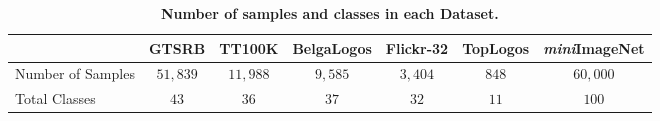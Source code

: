 \begin{table*}[h!]
\centering
\caption{\textbf{Number of samples and classes in each Dataset.}}
\begin{tabular}{@{}lcccccc@{}}
\toprule
                  & GTSRB    & TT100K   & BelgaLogos & Flickr-32 & TopLogos & \textit{mini}ImageNet \\ \midrule
Number of Samples & $51,839$ & $11,988$ & $9,585$    & $3,404$   & $848$    & $60,000$                               \\
Total Classes     & $43$     & $36$     & $37$       & $32$      & $11$     & $100$                                  \\ \bottomrule
\end{tabular}

\label{tab:data_size}
\end{table*}